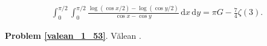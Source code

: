 %

\begin{problem_with_solution}
    \label{valean_1_53}%
    \begin{align}
        \int_0^{\pi/2} \int_0^{\pi/2} \frac{\log (\cos x/2) - \log (\cos y/2)}{\cos x - \cos y} \,\mathrm{d}x \,\mathrm{d}y = \pi G - \frac 74 \zeta(3).
    \end{align}
\end{problem_with_solution}


\textbf{Problem \ref{valean_1_53}}.
Vălean \cite[s. 34]{nahin15}.


%